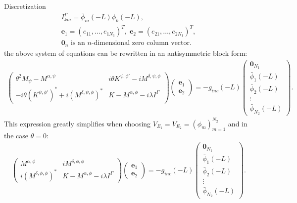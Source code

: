 \documentclass[11pt]{amsart}
\begin{document}
\begin{subsection}{Discretization}
\begin{align*}
I_{km}^{\Gamma}=\bar{\phi}_{m}(-L)\phi_{k}(-L),\\
\boldsymbol{e}_{1}=\left(e_{11},\ldots,e_{1 N_{1}}\right)^{T},\; \boldsymbol{e}_{2}=\left(e_{21},\ldots,e_{2 N_{1}}\right)^{T},\\
\boldsymbol{0}_{n} \text{ is an $n$-dimensional zero column vector}.
\end{align*}
the above system of equations can be rewritten in an antisymmetric block form:
\begin{align*}
\left(\begin{matrix}
\theta^2 M_{\psi}-M^{\alpha,\psi} & i\theta K^{\psi,\phi'}-i M^{\delta,\psi,\phi} \\
-i\theta (K^{\psi,\phi'})^{*}+i (M^{\delta,\psi,\phi})^{*} & K-M^{\alpha,\phi}-i\lambda I^{\Gamma}
\end{matrix}\right)
\left(
\begin{matrix}
\boldsymbol{e}_1\\
\boldsymbol{e}_2
\end{matrix}
\right)=-g_{inc}(-L)
\left(
\begin{matrix}
\boldsymbol{0}_{N_{1}}\\
\bar{\phi}_{1}(-L)\\
\bar{\phi}_{2}(-L)\\
\vdots\\
\bar{\phi}_{N_{2}}(-L)
\end{matrix}
\right).
\end{align*}
This expression greatly simplifies when choosing $V_{E_{1}}=V_{E_{2}}=\left(\phi_{m}\right)_{m=1}^{N_{2}}$ and in the case $\theta=0$:
\begin{align}
\label{eq:simple_system}
\left(\begin{matrix}
M^{\alpha,\phi} & i M^{\delta,\phi,\phi} \\
i (M^{\delta,\phi,\phi})^{*} & K-M^{\alpha,\phi}-i\lambda I^{\Gamma}
\end{matrix}\right)
\left(
\begin{matrix}
\boldsymbol{e}_1\\ 
\boldsymbol{e}_2
\end{matrix}
\right)=-g_{inc}(-L)
\left(
\begin{matrix}
\boldsymbol{0}_{N_{1}}\\
\bar{\phi}_{1}(-L)\\
\bar{\phi}_{2}(-L)\\
\vdots\\
\bar{\phi}_{N_{2}}(-L)
\end{matrix}
\right).
\end{align}
\end{subsection}
\end{document}
